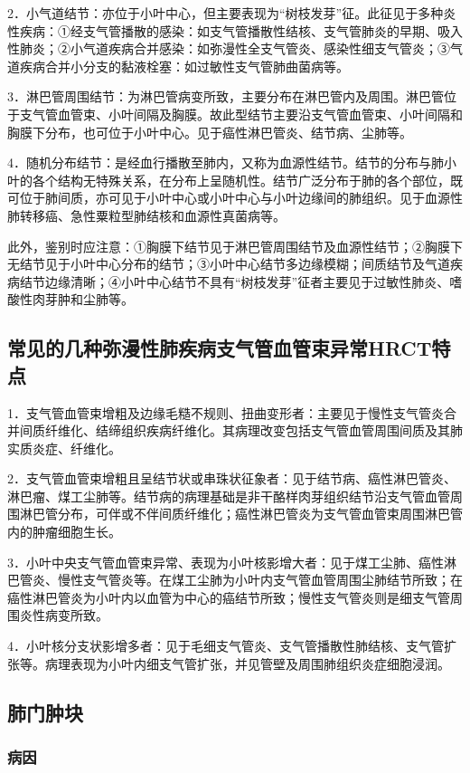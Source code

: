 2．小气道结节：亦位于小叶中心，但主要表现为“树枝发芽”征。此征见于多种炎性疾病：①经支气管播散的感染：如支气管播散性结核、支气管肺炎的早期、吸入性肺炎；②小气道疾病合并感染：如弥漫性全支气管炎、感染性细支气管炎；③气道疾病合并小分支的黏液栓塞：如过敏性支气管肺曲菌病等。

3．淋巴管周围结节：为淋巴管病变所致，主要分布在淋巴管内及周围。淋巴管位于支气管血管束、小叶间隔及胸膜。故此型结节主要沿支气管血管束、小叶间隔和胸膜下分布，也可位于小叶中心。见于癌性淋巴管炎、结节病、尘肺等。

4．随机分布结节：是经血行播散至肺内，又称为血源性结节。结节的分布与肺小叶的各个结构无特殊关系，在分布上呈随机性。结节广泛分布于肺的各个部位，既可位于肺间质，亦可见于小叶中心或小叶中心与小叶边缘间的肺组织。见于血源性肺转移癌、急性粟粒型肺结核和血源性真菌病等。

此外，鉴别时应注意：①胸膜下结节见于淋巴管周围结节及血源性结节；②胸膜下无结节见于小叶中心分布的结节；③小叶中心结节多边缘模糊；间质结节及气道疾病结节边缘清晰；④小叶中心结节不具有“树枝发芽”征者主要见于过敏性肺炎、嗜酸性肉芽肿和尘肺等。

\subsection{常见的几种弥漫性肺疾病支气管血管束异常HRCT特点}

1．支气管血管束增粗及边缘毛糙不规则、扭曲变形者：主要见于慢性支气管炎合并间质纤维化、结缔组织疾病纤维化。其病理改变包括支气管血管周围间质及其肺实质炎症、纤维化。

2．支气管血管束增粗且呈结节状或串珠状征象者：见于结节病、癌性淋巴管炎、淋巴瘤、煤工尘肺等。结节病的病理基础是非干酪样肉芽组织结节沿支气管血管周围淋巴管分布，可伴或不伴间质纤维化；癌性淋巴管炎为支气管血管束周围淋巴管内的肿瘤细胞生长。

3．小叶中央支气管血管束异常、表现为小叶核影增大者：见于煤工尘肺、癌性淋巴管炎、慢性支气管炎等。在煤工尘肺为小叶内支气管血管周围尘肺结节所致；在癌性淋巴管炎为小叶内以血管为中心的癌结节所致；慢性支气管炎则是细支气管周围炎性病变所致。

4．小叶核分支状影增多者：见于毛细支气管炎、支气管播散性肺结核、支气管扩张等。病理表现为小叶内细支气管扩张，并见管壁及周围肺组织炎症细胞浸润。

\subsection{肺门肿块}

\subsubsection{病因}

